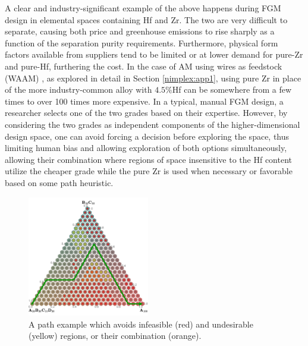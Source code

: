 A clear and industry-significant example of the above happens during FGM design in elemental spaces containing Hf and Zr. The two are very difficult to separate, causing both price and greenhouse emissions to rise sharply as a function of the separation purity requirements. Furthermore, physical form factors available from suppliers tend to be limited or at lower demand for pure-Zr and pure-Hf, furthering the cost. In 
the case of AM using wires as feedstock (WAAM) \cite{Shen2016FabricationProcess}, as explored in detail in Section \ref{nimplex:app1}, using pure Zr in place of the more industry-common alloy with $4.5\%$Hf can be somewhere from a few times to over 100 times more expensive. In a typical, manual FGM design, a researcher selects one of the two grades based on their expertise. However, by considering the two grades as independent components of the higher-dimensional design space, one can avoid forcing a decision before exploring the space, thus limiting human bias and allowing exploration of both options simultaneously, allowing their combination where regions of space insensitive to the Hf content utilize the cheaper grade while the pure Zr is used when necessary or favorable based on some path heuristic.

\begin{figure}[H]
    \centering
    \includegraphics[width=0.475\textwidth]{nimplex/PathPlanning_1.png}
    \vspace{-6pt}
    \caption{A path example which avoids infeasible (red) and undesirable (yellow) regions, or their combination (orange).} 
    \label{nimplex:fig:pathplanning1}
\end{figure}

